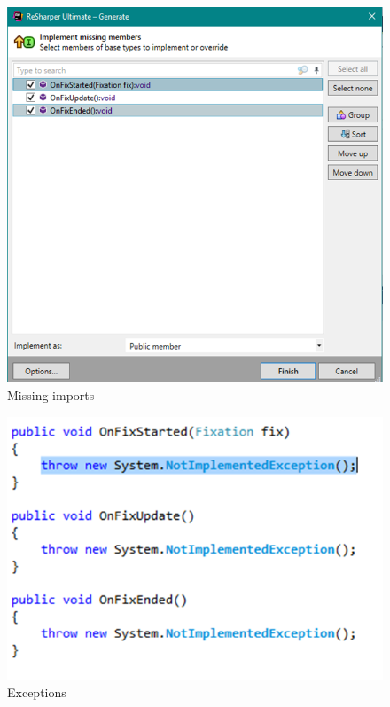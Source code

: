 \documentclass[../../Instructions_Framework]{subfiles}
\begin{document}
\begin{enumerate}
	\begin{figure}[htb]
		\centering
		\includegraphics[width=0.5\linewidth]{img/screenshot001}
		\caption{Missing imports}
		\label{vs}
	\end{figure}
	\begin{figure}[htb]
		\centering
		\includegraphics[width=0.5\linewidth]{img/screenshot006}
		\caption{Exceptions}
		\label{delete}
	\end{figure}
	

\end{enumerate}
\end{document}

